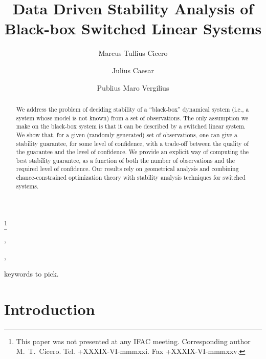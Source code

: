 \documentclass[twocolumn]{autart}
\begin{document}
\begin{frontmatter}
\title{Data Driven Stability Analysis of Black-box Switched Linear Systems}

\thanks[footnoteinfo]{This paper was not presented at any IFAC 
meeting. Corresponding author M.~T.~Cicero. Tel. +XXXIX-VI-mmmxxi. 
Fax +XXXIX-VI-mmmxxv.}

\author[Paestum]{Marcus Tullius Cicero},    %
\author[Rome]{Julius Caesar},               %
\author[Baiae]{Publius Maro Vergilius}  %

\address[Paestum]{Buckingham Palace, Paestum}  %
\address[Rome]{Senate House, Rome}             %
\address[Baiae]{The White House, Baiae}        %


\begin{keyword}                           %
keywords to pick.                         %
\end{keyword}                             %



\begin{abstract}
We address the problem of deciding stability of a ``black-box'' dynamical system (i.e., a system whose model is not known) from a set of observations. The only assumption we make on the black-box system is that it can be described by a switched linear system. We show that, for a given (randomly generated) set of observations, one can give a stability guarantee, for some level of confidence, with a trade-off between the quality of the guarantee and the level of confidence. We provide an explicit way of computing the best stability guarantee, as a function of both the number of observations and the required level of confidence. Our results rely on geometrical analysis and combining chance-constrained optimization theory with stability analysis techniques for switched systems.
\end{abstract}
\end{frontmatter}

\section{Introduction}

\end{document}
